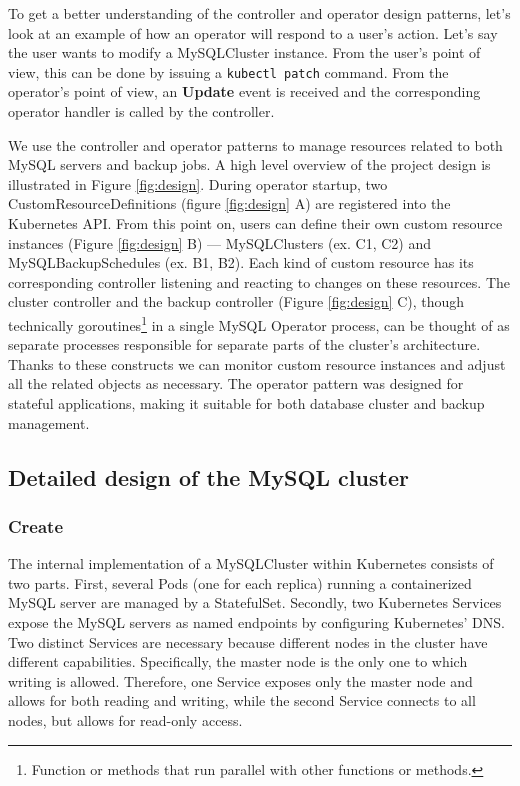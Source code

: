 To get a better understanding of the controller and operator design patterns, let’s look at an
example of how an operator will respond to a user’s action. Let’s say the user wants to modify a
MySQLCluster instance. From the user’s point of view, this can be done by issuing a
\texttt{kubectl patch} command. From the operator’s point of view, an \textbf{Update} event is
received and the corresponding operator handler is called by the controller.

We use the controller and operator patterns to manage resources related to both 
MySQL servers and backup jobs. A high level overview of the project design is
illustrated in Figure \ref{fig:design}. During operator startup, two
CustomResourceDefinitions (figure \ref{fig:design} A) are registered into the Kubernetes API.
From this point on, users can define their own custom resource instances (Figure \ref{fig:design} B) ---
MySQLClusters (ex. C1, C2) and MySQLBackupSchedules (ex. B1, B2). Each kind of
custom resource has its corresponding controller listening and reacting to changes on these
resources. The cluster controller and the backup controller (Figure \ref{fig:design} C), though technically
goroutines\footnote{Function or methods that run parallel with other functions or methods.} in a single
MySQL Operator process, can be thought of as separate processes responsible for separate parts of the
cluster’s architecture. Thanks to these constructs we can monitor custom resource instances and adjust
all the related objects as necessary. The operator pattern was designed for stateful applications, making
it suitable for both database cluster and backup management.~\cite{coreos}

\subsection{Detailed design of the MySQL cluster}

\subsubsection*{Create}
The internal implementation of a MySQLCluster within Kubernetes consists of two parts. First,
several Pods (one for each replica) running a containerized MySQL server are managed by a
StatefulSet. Secondly, two Kubernetes Services expose the MySQL servers as named endpoints by
configuring Kubernetes’ DNS. Two distinct Services are necessary because different nodes in the
cluster have different capabilities. Specifically, the master node is the only one to which writing
is allowed. Therefore, one Service exposes only the  master node and allows for both reading and
writing, while the second Service connects to all nodes, but allows for read-only access. 

